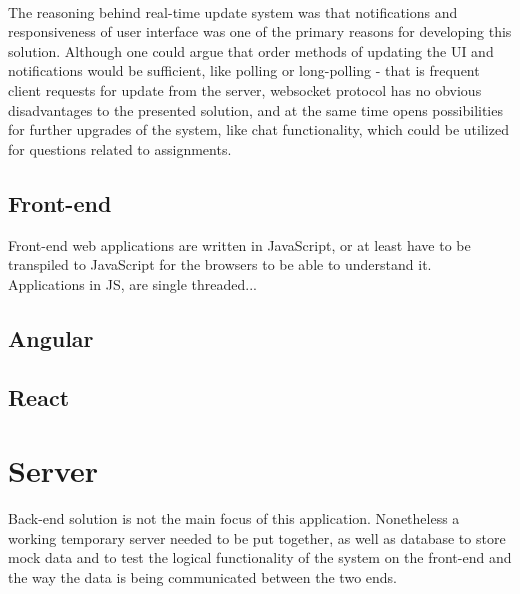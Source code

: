 \\The reasoning behind real-time update system was that notifications and responsiveness of user interface was one of the primary reasons for developing this solution. Although one could argue that order methods of updating the UI and notifications would be sufficient, like polling or long-polling - that is frequent client requests for update from the server, websocket protocol has no obvious disadvantages to the presented solution, and at the same time opens possibilities for further upgrades of the system, like chat functionality, which could be utilized for questions related to assignments.
\subsection{Front-end}
Front-end web applications are written in JavaScript, or at least have to be transpiled to JavaScript for the browsers to be able to understand it. Applications in JS, are single threaded...
\subsection{Angular}
\subsection{React}

\section{Server}
Back-end solution is not the main focus of this application. Nonetheless a working temporary server needed to be put together, as well as database to store mock data and to test the logical functionality of the system on the front-end and the way the data is being communicated between the two ends.
